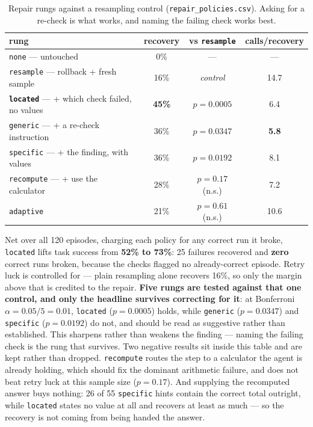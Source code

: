\documentclass{article}
\begin{document}
\begin{table}[h]
\centering
\caption{Repair rungs against a resampling control (\texttt{repair\_policies.csv}).
Asking for a re-check is what works, and naming the failing check works best.}
\label{tab:repair}
\begin{tabular}{lccc}
\toprule
rung & recovery & vs \texttt{resample} & calls/recovery \\
\midrule
\texttt{none} --- untouched & 0\% & --- & --- \\
\texttt{resample} --- rollback + fresh sample & 16\% & \emph{control} & 14.7 \\
\textbf{\texttt{located}} --- + which check failed, no values & \textbf{45\%} & \textbf{$p=0.0005$} & 6.4 \\
\texttt{generic} --- + a re-check instruction & 36\% & $p=0.0347$ & \textbf{5.8} \\
\texttt{specific} --- + the finding, with values & 36\% & $p=0.0192$ & 8.1 \\
\texttt{recompute} --- + use the calculator & 28\% & $p=0.17$ (n.s.) & 7.2 \\
\texttt{adaptive} & 21\% & $p=0.61$ (n.s.) & 10.6 \\
\bottomrule
\end{tabular}
\end{table}

Net over all 120 episodes, charging each policy for any correct run it broke,
\texttt{located} lifts task success from \textbf{52\% to 73\%}: 25 failures
recovered and \textbf{zero} correct runs broken, because the checks flagged no
already-correct episode. Retry luck is controlled for --- plain resampling alone
recovers 16\%, so only the margin above that is credited to the repair.
\textbf{Five rungs are tested against that one control, and only the headline
survives correcting for it}: at Bonferroni $\alpha=0.05/5=0.01$,
\texttt{located} ($p=0.0005$) holds, while \texttt{generic} ($p=0.0347$) and
\texttt{specific} ($p=0.0192$) do not, and should be read as suggestive rather
than established. This sharpens rather than weakens the finding --- naming the
failing check is the rung that survives. Two
negative results sit inside this table and are kept rather than dropped.
\texttt{recompute} routes the step to a calculator the agent is already holding,
which should fix the dominant arithmetic failure, and does not beat retry luck at
this sample size ($p=0.17$). And supplying the recomputed answer buys nothing:
26 of 55 \texttt{specific} hints contain the correct total outright, while
\texttt{located} states no value at all and recovers at least as much --- so the
recovery is not coming from being handed the answer.
\end{document}
